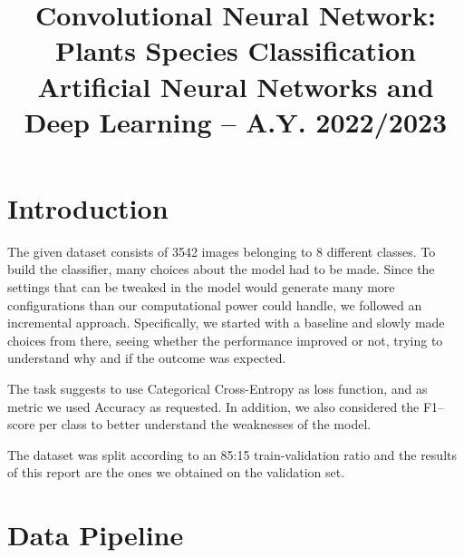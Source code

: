\documentclass[conference,compsoc,11pt]{IEEEtran}
\begin{document}
\title{Convolutional Neural Network:\\ Plants Species Classification
\\ \large Artificial Neural Networks and Deep Learning -- A.Y. 2022/2023}

\author{
}
\maketitle


\IEEEpeerreviewmaketitle

\section{Introduction}
The given dataset consists of 3542 images belonging to 8 different classes. To build the classifier, many choices about the model had to be made. Since the settings that can be tweaked in the model would generate many more configurations than our computational power could handle, we followed an incremental approach. Specifically, we started with a baseline and slowly made choices from there, seeing whether the performance improved or not, trying to understand why and if the outcome was expected.

The task suggests to use Categorical Cross-Entropy as loss function, and as metric we used Accuracy as requested. In addition, we also considered the F1--score per class to better understand the weaknesses of the model.

The dataset was split according to an 85:15 train-validation ratio and the results of this report are the ones we obtained on the validation set.

\section{Data Pipeline}
\end{document}
